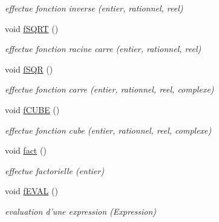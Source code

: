 \begin{DoxyCompactItemize}
\begin{DoxyCompactList}\small\item\em effectue fonction inverse (entier, rationnel, reel) \end{DoxyCompactList}\item 
\hypertarget{class_pile_af1480988b888425a246a1f5368824659}{void \hyperlink{class_pile_af1480988b888425a246a1f5368824659}{f\-S\-Q\-R\-T} ()}\label{class_pile_af1480988b888425a246a1f5368824659}

\begin{DoxyCompactList}\small\item\em effectue fonction racine carre (entier, rationnel, reel) \end{DoxyCompactList}\item 
\hypertarget{class_pile_af39fcfe00509c9d155e8851d7b7fd2f7}{void \hyperlink{class_pile_af39fcfe00509c9d155e8851d7b7fd2f7}{f\-S\-Q\-R} ()}\label{class_pile_af39fcfe00509c9d155e8851d7b7fd2f7}

\begin{DoxyCompactList}\small\item\em effectue fonction carre (entier, rationnel, reel, complexe) \end{DoxyCompactList}\item 
\hypertarget{class_pile_adc93d5906457e6d9337e0e763c39f70b}{void \hyperlink{class_pile_adc93d5906457e6d9337e0e763c39f70b}{f\-C\-U\-B\-E} ()}\label{class_pile_adc93d5906457e6d9337e0e763c39f70b}

\begin{DoxyCompactList}\small\item\em effectue fonction cube (entier, rationnel, reel, complexe) \end{DoxyCompactList}\item 
\hypertarget{class_pile_a582a24a17a82fc63985900765b0499b4}{void \hyperlink{class_pile_a582a24a17a82fc63985900765b0499b4}{fact} ()}\label{class_pile_a582a24a17a82fc63985900765b0499b4}

\begin{DoxyCompactList}\small\item\em effectue factorielle (entier) \end{DoxyCompactList}\item 
\hypertarget{class_pile_a7e676351f3811c37c4866071162050de}{void \hyperlink{class_pile_a7e676351f3811c37c4866071162050de}{f\-E\-V\-A\-L} ()}\label{class_pile_a7e676351f3811c37c4866071162050de}

\begin{DoxyCompactList}\small\item\em evaluation d'une expression (Expression) \end{DoxyCompactList}\end{DoxyCompactItemize}
